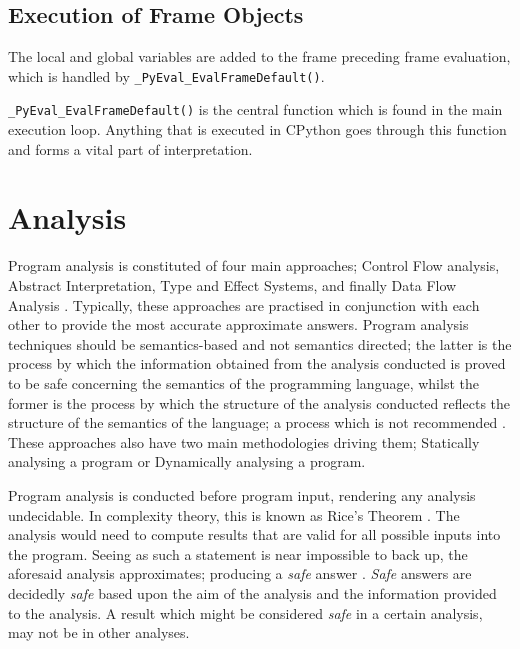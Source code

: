 {		\subsection{Execution of Frame Objects}
		\par The local and global variables are added to the frame preceding frame evaluation, which is handled by \lstinline|_PyEval_EvalFrameDefault()|. 
		\par\lstinline|_PyEval_EvalFrameDefault()| is the central function which is found in the main execution loop. Anything that is executed in CPython goes through
		this function and forms a vital part of interpretation.


	\section{Analysis}
	\par Program analysis is constituted of four main approaches; Control Flow analysis, Abstract Interpretation, Type and Effect Systems, and finally Data Flow 
	Analysis \cite[pp.1--2]{nielson2004principlesofPA}. Typically, these approaches are practised in conjunction with each other to provide the most accurate approximate answers.
	Program analysis techniques should be semantics-based and not semantics directed; the latter is the process by which the information obtained from the analysis conducted is proved
	to be safe concerning the semantics of the programming language, whilst the former is the process by which the structure of the analysis conducted reflects the structure of the semantics of the language; a process which is 
	not recommended \cite[pp.2--3]{nielson2004principlesofPA}. These approaches also have two main methodologies driving them; Statically analysing a program or Dynamically analysing a program.
	\par Program analysis is conducted before program input, rendering any analysis undecidable. In complexity theory, this is known as Rice's Theorem \cite[]{rice1953classes}. The analysis would need to compute results that are valid for 
	all possible inputs into the program. Seeing as such a statement is near impossible to back up, the aforesaid analysis approximates; producing a \textit{safe} answer \cite[pp.9--11]{andersen1994program}. \textit{Safe} answers are decidedly
	\textit{safe} based upon the aim of the analysis and the information provided to the analysis. A result which might be considered \textit{safe} in a certain analysis, may not be in other analyses.


}
